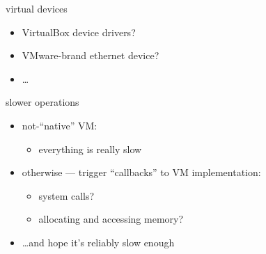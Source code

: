
\begin{frame}{virtual devices}
    \begin{itemize}
    \item VirtualBox device drivers?
    \item VMware-brand ethernet device?
    \item \ldots
    \end{itemize}
\end{frame}


\begin{frame}{slower operations}
    \begin{itemize}
    \item not-``native'' VM:
        \begin{itemize}
        \item everything is really slow
        \end{itemize}
    \item otherwise --- trigger ``callbacks'' to VM implementation:
        \begin{itemize}
        \item system calls?
        \item allocating and accessing memory?
        \end{itemize}
    \item \ldots and hope it's reliably slow enough
    \end{itemize}
\end{frame}




